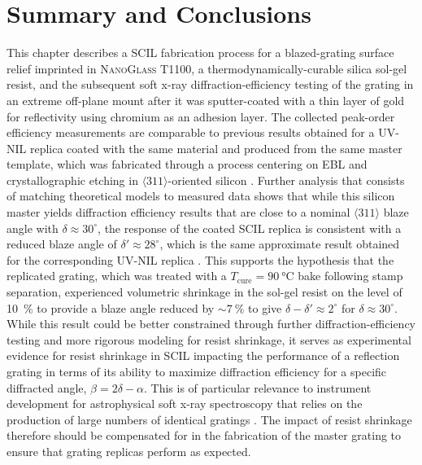 \section{Summary and Conclusions}\label{sec:conclusion}
This chapter describes a SCIL fabrication process for a blazed-grating surface relief imprinted in \textsc{NanoGlass T1100}, a thermodynamically-curable silica sol-gel resist, and the subsequent soft x-ray diffraction-efficiency testing of the grating in an extreme off-plane mount after it was sputter-coated with a thin layer of gold for reflectivity using chromium as an adhesion layer. 
The collected peak-order efficiency measurements are comparable to previous results obtained for a UV-NIL replica coated with the same material and produced from the same master template, which was fabricated through a process centering on EBL and crystallographic etching in $\langle 311 \rangle$-oriented silicon \cite[\emph{cf.\@} \cref{sec:crystal_etching}]{Miles18}. 
Further analysis that consists of matching theoretical models to measured data shows that while this silicon master yields diffraction efficiency results that are close to a nominal $\langle 311 \rangle$ blaze angle with $\delta \approx 30^{\circ}$, the response of the coated SCIL replica is consistent with a reduced blaze angle of $\delta' \approx 28^{\circ}$, which is the same approximate result obtained for the corresponding UV-NIL replica \cite[\emph{cf.\@} \cref{sec:nanoimprint}]{Miles18}. 
This supports the hypothesis that the replicated grating, which was treated with a $T_{\text{cure}} = \SI{90}{\celsius}$ bake following stamp separation, experienced volumetric shrinkage in the sol-gel resist on the level of \SI{10}{\percent} to provide a blaze angle reduced by $\sim \SI{7}{\percent}$ to give $\delta - \delta' \approx 2^{\circ}$ for $\delta \approx 30^{\circ}$.  
While this result could be better constrained through further diffraction-efficiency testing and more rigorous modeling for resist shrinkage,
it serves as experimental evidence for resist shrinkage in SCIL impacting the performance of a reflection grating in terms of its ability to maximize diffraction efficiency for a specific diffracted angle, $\beta = 2 \delta - \alpha$. 
This is of particular relevance to instrument development for astrophysical soft x-ray spectroscopy that relies on the production of large numbers of identical gratings \cite{Miles19b,Tutt18,McEntaffer19}. 
The impact of resist shrinkage therefore should be compensated for in the fabrication of the master grating to ensure that grating replicas perform as expected. 
